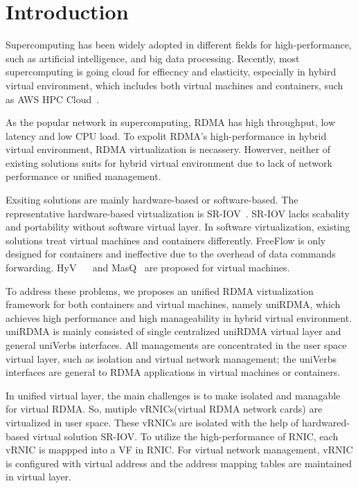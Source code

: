 \section{Introduction}
 Supercomputing has been widely adopted in different fields for high-performance, such as artificial intelligence, and big data processing. Recently, most supercomputing is going cloud for effiecncy and elasticity, especially in hybird virtual environment, which includes both virtual machines and containers, such as AWS HPC Cloud~\cite{aws-hpc}. 

As the popular network in supercomputing, RDMA has high throughput, low latency and low CPU load. To expolit RDMA's high-performance in hybrid virtual environment, RDMA virtualization is necassery. Howerver, neither of existing solutions suits for hybrid virtual environment due to lack of network performance or unified management.

Exsiting solutions are mainly hardware-based or software-based. The representative hardware-based virtualization is SR-IOV~\cite{sr-iov}. SR-IOV lacks scabality and portability without software virtual layer. In software virtualization, existing solutions treat virtual machines and containers differently. FreeFlow is only designed for containers and ineffective due to the overhead of data commands forwarding.  HyV~\cite{pfefferle2015hybrid} ~\cite{pfefferle2014vverbs} and MasQ~\cite{he2020masq} are proposed for virtual machines.

To address these problems, we proposes an unified RDMA virtualization framework for both containers and virtual machines, namely uniRDMA, which achieves high performance and high manageability in hybrid virtual environment. uniRDMA is mainly consisted of single centralized uniRDMA virtual layer and general uniVerbs interfaces. All managements are concentrated in the user space virtual layer, such as isolation and virtual network management; the uniVerbs interfaces are general to RDMA applications in virtual machines or containers. 

In unified virtual layer, the main challenges is to make isolated and managable for virtual RDMA. So, mutiple vRNICs(virtual RDMA network cards) are virtualized in user space. These vRNICs are isolated with the help of hardwared-based virtual solution SR-IOV. To utilize the high-performance of RNIC, each vRNIC is mappped into a VF in RNIC. For virtual network management, vRNIC is configured with virtual address and the address mapping tables are maintained in virtual layer.

